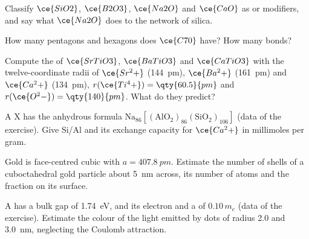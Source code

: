 \begin{exercise}[$\star$]\label{exo:b3:inorganic-materials:3}
Classify $\ce{SiO2}$, $\ce{B2O3}$, $\ce{Na2O}$ and $\ce{CaO}$ as  or modifiers, and say what
$\ce{Na2O}$ does to the network of silica.
\end{exercise}

\begin{exercise}[$\star$]\label{exo:b3:inorganic-materials:4}
How many pentagons and hexagons does $\ce{C70}$ have? How many bonds?
\end{exercise}

\begin{exercise}[$\star\star$]\label{exo:b3:inorganic-materials:5}
Compute the  of $\ce{SrTiO3}$, $\ce{BaTiO3}$ and $\ce{CaTiO3}$ with the twelve-coordinate radii
of $\ce{Sr^2+}$ (\qty{144}{pm}), $\ce{Ba^2+}$ (\qty{161}{pm}) and $\ce{Ca^2+}$ (\qty{134}{pm}), $r(\ce{Ti^4+}) = \qty{60.5}{pm}$ and $r(\ce{O^2-}) = \qty{140}{pm}$. What
do they predict?
\end{exercise}

\begin{exercise}[$\star\star$]\label{exo:b3:inorganic-materials:6}
A  X has the anhydrous formula $\mathrm{Na_{86}[(AlO_2)_{86}(SiO_2)_{106}]}$ (data of the exercise).
Give Si/Al and its exchange capacity for $\ce{Ca^2+}$ in millimoles per gram.
\end{exercise}

\begin{exercise}[$\star\star$]\label{exo:b3:inorganic-materials:7}
Gold is face-centred cubic with $a = \qty{407.8}{pm}$. Estimate the number of shells of a
cuboctahedral gold particle about \qty{5}{nm} across, its number of atoms and the
fraction on its surface.
\end{exercise}

\begin{exercise}[$\star\star$]\label{exo:b3:inorganic-materials:8}
A  has a bulk gap of \qty{1.74}{eV}, and its electron and  a  of $0.10\,m_e$ (data of the exercise). Estimate the colour of the light emitted by
dots of radius 2.0 and \qty{3.0}{nm}, neglecting the Coulomb attraction.
\end{exercise}

